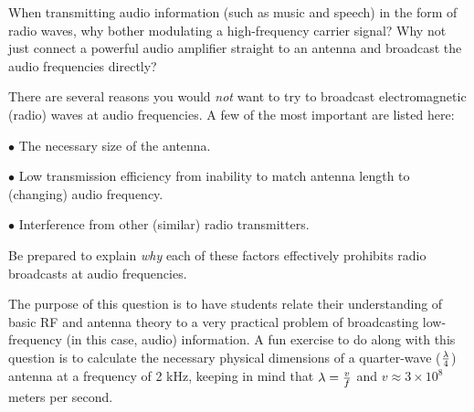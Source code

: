 

When transmitting audio information (such as music and speech) in the form of radio waves, why bother modulating a high-frequency carrier signal?  Why not just connect a powerful audio amplifier straight to an antenna and broadcast the audio frequencies directly?







There are several reasons you would {\it not} want to try to broadcast electromagnetic (radio) waves at audio frequencies.  A few of the most important are listed here:

\medskip
\goodbreak
\item{$\bullet$} The necessary size of the antenna.
\item{$\bullet$} Low transmission efficiency from inability to match antenna length to (changing) audio frequency.
\item{$\bullet$} Interference from other (similar) radio transmitters.
\medskip

Be prepared to explain {\it why} each of these factors effectively prohibits radio broadcasts at audio frequencies.







The purpose of this question is to have students relate their understanding of basic RF and antenna theory to a very practical problem of broadcasting low-frequency (in this case, audio) information.  A fun exercise to do along with this question is to calculate the necessary physical dimensions of a quarter-wave ($\lambda \over 4$) antenna at a frequency of 2 kHz, keeping in mind that $\lambda = {v \over f}$ and $v \approx 3 \times 10^8$ meters per second.




